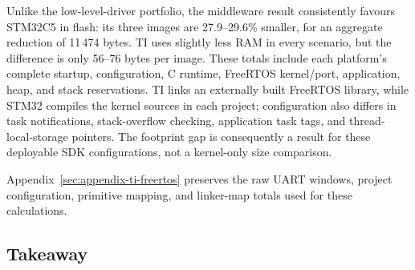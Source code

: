 \begin{table}[H]
\centering
\caption{FreeRTOS whole-image footprint under IAR high/size optimisation (bytes).}
\label{tab:ti-freertos-footprint}
\end{table}

Unlike the low-level-driver portfolio, the middleware result consistently favours STM32C5 in
flash: its three images are 27.9--29.6\% smaller, for an aggregate reduction of 11\,474 bytes.
TI uses slightly less RAM in every scenario, but the difference is only 56--76 bytes per image.
These totals include each platform's complete startup, configuration, C runtime, FreeRTOS
kernel/port, application, heap, and stack reservations. TI links an externally built FreeRTOS
library, while STM32 compiles the kernel sources in each project; configuration also differs in
task notifications, stack-overflow checking, application task tags, and thread-local-storage
pointers. The footprint gap is consequently a result for these deployable SDK configurations,
not a kernel-only size comparison.

Appendix~\ref{sec:appendix-ti-freertos} preserves the raw UART windows, project configuration,
primitive mapping, and linker-map totals used for these calculations.

\subsection{Takeaway}
\label{subsec:ti-freertos-takeaway}

